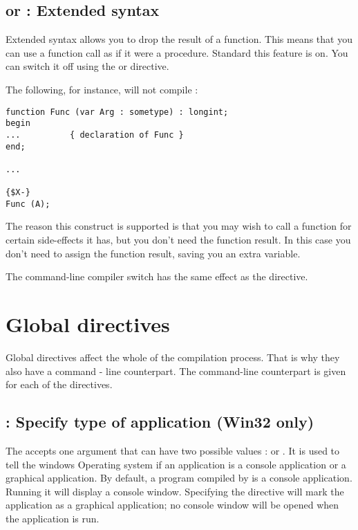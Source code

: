 \documentclass{report}
\begin{document}
\subsection{ or  : Extended syntax}
Extended syntax allows you to drop the result of a function. This means that
you can use a function call as if it were a procedure. Standard this feature
is on. You can switch it off using the  or
directive.

The following, for instance, will not compile :
\begin{verbatim}
function Func (var Arg : sometype) : longint;
begin
...          { declaration of Func }
end;

...

{$X-}
Func (A);
\end{verbatim}
The reason this construct is supported is that you may wish to call a
function for certain side-effects it has, but you don't need the function
result. In this case you don't need to assign the function result, saving
you an extra variable.

The command-line compiler switch  has the same effect as the
 directive.


\section{Global directives}
\label{se:GlobalSwitch}
Global directives affect the whole of the compilation process. That is why
they also have a command - line counterpart. The command-line counterpart is
given for each of the directives.

\subsection{ : Specify type of application (Win32 only)}

The  accepts one argument that can have two possible
values :  or . It is used to tell the windows
Operating system if an application is a console application or a graphical
application. By default, a program compiled by \fpc is a console
application. Running it will display a console window. Specifying the 
 directive will mark the application as a graphical
application; no console window will be opened when the application is run.
\end{document}
